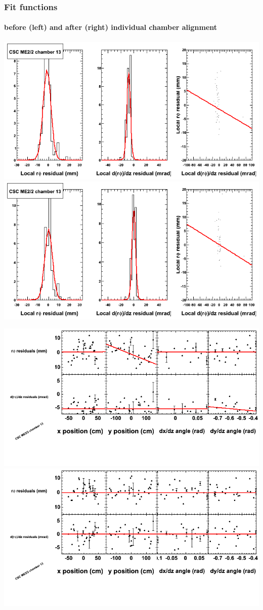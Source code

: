 \documentclass[compress]{beamer}
\begin{document}
\begin{frame}
\frametitle{Fit functions}
\framesubtitle{before (left) and after (right) individual chamber alignment}
\includegraphics[width=0.5\linewidth]{ringfits_3dof/beforefit_MEp22_13_bellcurve.png} \includegraphics[width=0.5\linewidth]{ringfits_3dof/afterfit_MEp22_13_bellcurve.png}

\includegraphics[width=0.5\linewidth]{ringfits_3dof/beforefit_MEp22_13_polynomials.png} \includegraphics[width=0.5\linewidth]{ringfits_3dof/afterfit_MEp22_13_polynomials.png}
\end{frame}
\end{document}
